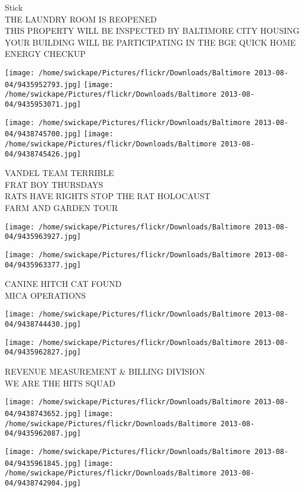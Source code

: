 \documentclass[10pt,letterpaper]{article}
\begin{document}
Stick\\
THE LAUNDRY ROOM IS REOPENED\\
THIS PROPERTY WILL BE INSPECTED BY BALTIMORE CITY HOUSING\\
YOUR BUILDING WILL BE PARTICIPATING IN THE BGE QUICK HOME ENERGY CHECKUP
\pagebreak

\texttt{[image: /home/swickape/Pictures/flickr/Downloads/Baltimore 2013-08-04/9435952793.jpg]}
\texttt{[image: /home/swickape/Pictures/flickr/Downloads/Baltimore 2013-08-04/9435953071.jpg]}

\texttt{[image: /home/swickape/Pictures/flickr/Downloads/Baltimore 2013-08-04/9438745700.jpg]}
\texttt{[image: /home/swickape/Pictures/flickr/Downloads/Baltimore 2013-08-04/9438745426.jpg]}

VANDEL TEAM TERRIBLE\\
FRAT BOY THURSDAYS\\
RATS HAVE RIGHTS STOP THE RAT HOLOCAUST\\
FARM AND GARDEN TOUR
\pagebreak

\texttt{[image: /home/swickape/Pictures/flickr/Downloads/Baltimore 2013-08-04/9435963927.jpg]}

\vspace{0.25in}
\texttt{[image: /home/swickape/Pictures/flickr/Downloads/Baltimore 2013-08-04/9435963377.jpg]}

CANINE HITCH CAT FOUND\\
MICA OPERATIONS
\pagebreak

\texttt{[image: /home/swickape/Pictures/flickr/Downloads/Baltimore 2013-08-04/9438744430.jpg]}

\vspace{0.25in}
\texttt{[image: /home/swickape/Pictures/flickr/Downloads/Baltimore 2013-08-04/9435962827.jpg]}

REVENUE MEASUREMENT \& BILLING DIVISION\\
WE ARE THE HITS SQUAD
\pagebreak

\texttt{[image: /home/swickape/Pictures/flickr/Downloads/Baltimore 2013-08-04/9438743652.jpg]}
\texttt{[image: /home/swickape/Pictures/flickr/Downloads/Baltimore 2013-08-04/9435962087.jpg]}

\texttt{[image: /home/swickape/Pictures/flickr/Downloads/Baltimore 2013-08-04/9435961845.jpg]}
\texttt{[image: /home/swickape/Pictures/flickr/Downloads/Baltimore 2013-08-04/9438742904.jpg]}
\end{document}
